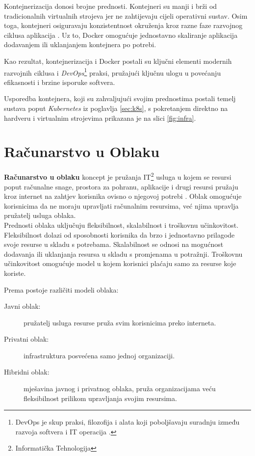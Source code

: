 \documentclass[times, utf8, diplomski]{fer}
\begin{document}
Kontejnerizacija donosi brojne prednosti. Kontejneri su manji i brži od tradicionalnih virtualnih strojeva jer ne zahtijevaju cijeli operativni sustav. Osim toga, kontejneri osiguravaju konzistentnost okruženja kroz razne faze razvojnog ciklusa aplikacija \citep{gillis_what_2020}. Uz to, Docker omogućuje jednostavno skaliranje aplikacija dodavanjem ili uklanjanjem kontejnera po potrebi.

Kao rezultat, kontejnerizacija i Docker postali su ključni elementi modernih razvojnih ciklusa i \emph{DevOps}\footnote{DevOps je skup praksi, filozofija i alata koji poboljšavaju suradnju između razvoja softvera  i IT operacija  \citep{courtemanche_what_2021}.} praksi, pružajući ključnu ulogu u povećanju efikasnosti i brzine isporuke softvera. 

Usporedba kontejnera, koji su zahvaljujući svojim prednostima postali temelj sustava poput \emph{Kubernetes} iz poglavlja \ref{sec:k8s}, s pokretanjem direktno na hardveru i virtualnim strojevima prikazana je na slici \ref{fig:infra}.

\section{Računarstvo u Oblaku}

\textbf{Računarstvo u oblaku}  koncept je pružanja IT\footnote{Informatička Tehnologija } usluga u kojem se resursi poput računalne snage, prostora za pohranu, aplikacije i drugi resursi pružaju kroz internet na zahtjev korisnika ovisno o njegovoj potrebi \citep{zarko_raspodijeljeni_2013}. Oblak omogućuje korisnicima da ne moraju upravljati računalnim resursima, već njima upravlja pružatelj usluga oblaka. \\

Prednosti oblaka uključuju fleksibilnost, skalabilnost i troškovnu učinkovitost. Fleksibilnost dolazi od sposobnosti korisnika da brzo i jednostavno prilagode svoje resurse u skladu s potrebama. Skalabilnost se odnosi na mogućnost dodavanja ili uklanjanja resursa u skladu s promjenama u potražnji. Troškovnu učinkovitost omogućuje model u kojem korisnici plaćaju samo za resurse koje koriste.

Prema \citet{zarko_raspodijeljeni_2013} postoje različiti modeli oblaka:
\begin{description}
	\item [Javni oblak:] pružatelj usluga resurse pruža svim korisnicima preko interneta.
	\item [Privatni oblak:] infrastruktura posvećena samo jednoj organizaciji.
	\item [Hibridni oblak:] mješavina javnog i privatnog oblaka, pruža organizacijama veću fleksibilnost prilikom upravljanja svojim resursima.
\end{description}
\end{document}
